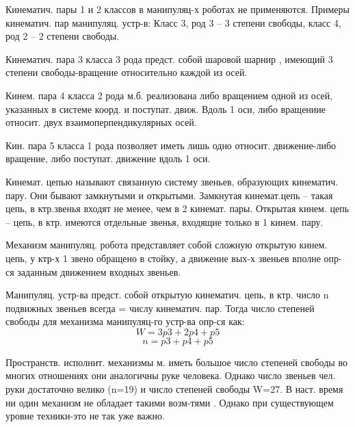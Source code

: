 \documentclass[unicode, 12pt, a4paper, oneside]{article}
\begin{document}
Кинематич. пары 1 и 2 классов в манипуляц-х роботах не применяются. Примеры кинематич. пар манипуляц. устр-в:
Класс 3, род 3 – 3 степени свободы, класс 4, род 2 – 2 степени свободы.

Кинематич. пара 3 класса 3 рода предст. собой шаровой шарнир , имеющий 3 степени свободы-вращение относительно каждой из осей.

 Кинем. пара 4 класса 2 рода м.б. реализована либо вращением одной из осей, указанных в системе коорд. и поступат. движ. Вдоль 1 оси, либо вращениие относит. двух взаимоперпендикулярных осей.

Кин. пара 5 класса 1 рода позволяет иметь лишь одно относит. движение-либо вращение, либо поступат. движение вдоль 1 оси.

Кинемат. цепью называют связанную систему звеньев, образующих кинематич. пару. Они бывают замкнутыми и открытыми. Замкнутая кинемат.цепь – такая цепь, в ктр.звенья входят не менее, чем в 2 кинемат. пары. Открытая кинем. цепь – цепь, в ктр. имеются отдельные звенья, входящие только в 1 кинем. пару.

Механизм манипуляц. робота представляет собой сложную открытую кинем. цепь, у ктр-х 1 звено обращено в стойку, а движение вых-х звеньев вполне опр-ся заданным движением входных звеньев.

Манипуляц. устр-ва предст. собой открытую кинематич. цепь, в ктр. число n подвижных звеньев всегда = числу кинематич. пар. Тогда число степеней свободы для механизма манипуляц-го устр-ва опр-ся как: \begin{equation}
W=3p3+2p4+p5
\end{equation}
\begin{equation}
n=p3+p4+p5
\end{equation}

Пространств. исполнит. механизмы м. иметь большое число степеней свободы во многих отношениях они аналогичны руке человека. Однако число звеньев чел. руки достаточно велико (n=19) и число степеней свободы W=27. В наст. время ни один механизм не обладает такими возм-тями . Однако при существующем уровне техники-это не так уже важно.
\end{document}
